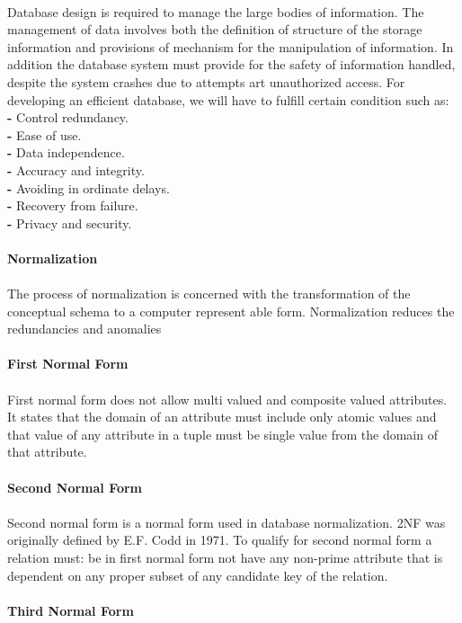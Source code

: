 \documentclass[a4paper, 12pt]{report}
\begin{document}
\paragraph{}
Database design is required to manage the large bodies of information. The management of data involves both the definition of structure of the storage information and provisions of mechanism for the manipulation of information. In addition the database system must provide for the safety of information handled, despite the system crashes due to attempts art unauthorized access. For developing an efficient database, we will have to fulfill certain condition such as:\\
\fontsize{12pt}{12pt}\selectfont
\textbf{- }Control redundancy.\\
\textbf{- }Ease of use.\\
\textbf {- }Data independence.\\
\textbf{- }Accuracy and integrity.\\
\textbf{- }Avoiding in ordinate delays.\\
\textbf{- }Recovery from failure.\\
\textbf{- }Privacy and security.\\
\\
\textbf{Normalization}
\paragraph{}
The process of normalization is concerned with the transformation of the conceptual schema to a
computer represent able form. Normalization reduces the redundancies and anomalies
\\
\\
\textbf{First Normal Form}
\paragraph{}
First normal form does not allow multi valued and composite valued attributes. It states that the
domain of an attribute must include only atomic values and that value of any attribute in a tuple must
be single value from the domain of that attribute.
\\
\\
\textbf{Second Normal Form}
\paragraph{}
Second normal form is a normal form used in database normalization. 2NF was originally defined
by E.F. Codd in 1971. To qualify for second normal form a relation must: be in first normal form not
have any non-prime attribute that is dependent on any proper subset of any candidate key of the relation.
\\
\\
\textbf{Third Normal Form}
\end{document}
